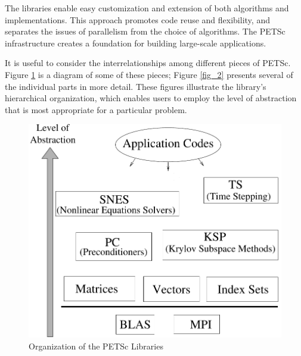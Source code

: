 The libraries enable easy customization and extension of both algorithms
and implementations.  This approach promotes code reuse and
flexibility, and separates the issues of parallelism from the choice
of algorithms.  The PETSc infrastructure creates a
foundation for building large-scale applications.

It is useful to consider the interrelationships among different
pieces of PETSc.  Figure \ref{fig_1} is a diagram of some 
of these pieces; Figure \ref{fig_2} presents
several of the individual parts in more detail.
These figures illustrate the library's hierarchical organization,
which enables users to employ the level of abstraction that is most 
appropriate for a particular problem.  
\begin{figure}[hbt]
\centerline{ \includegraphics{petscwww}}
\caption{Organization of the PETSc Libraries}
\label{fig_1}
\end{figure}

